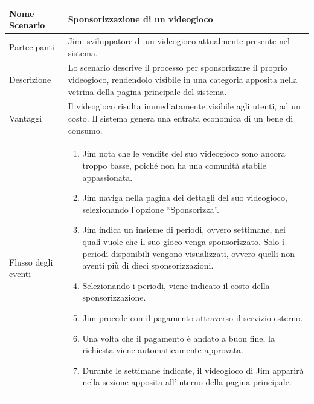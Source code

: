 	\small\begin{tabular}{|| l | p{30em} ||} 
	\hline
	Nome Scenario & Sponsorizzazione di un videogioco\\
	\hline
	Partecipanti & Jim: sviluppatore di un videogioco attualmente presente nel sistema.\\
	\hline
	Descrizione & Lo scenario descrive il processo per sponsorizzare il proprio videogioco, rendendolo visibile in una categoria apposita nella vetrina della pagina principale del sistema.\\
	\hline
	Vantaggi & Il videogioco risulta immediatamente visibile agli utenti, ad un costo. Il sistema genera una entrata economica di un bene di consumo.\\
	\hline
	Flusso degli eventi &
	\begin{enumerate}
		\item Jim nota che le vendite del suo videogioco sono ancora troppo basse, poiché non ha una comunità stabile appassionata.
		\item Jim naviga nella pagina dei dettagli del suo videogioco, selezionando l’opzione “Sponsorizza”.
		\item Jim indica un insieme di periodi, ovvero settimane, nei quali vuole che il suo gioco venga sponsorizzato. Solo i periodi disponibili vengono visualizzati, ovvero quelli non aventi più di dieci sponsorizzazioni.
		\item Selezionando i periodi, viene indicato il costo della sponsorizzazione.
		\item Jim procede con il pagamento attraverso il servizio esterno.
		\item Una volta che il pagamento è andato a buon fine, la richiesta viene automaticamente approvata.
		\item Durante le settimane indicate, il videogioco di Jim apparirà nella sezione apposita all’interno della pagina principale.		
	\end{enumerate} \\
	\hline
	\end{tabular}

